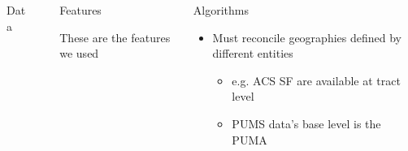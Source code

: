 \documentclass[final, 14pt]{beamer}
\newlength{\sepwid}
\newlength{\onecolwid}
\newlength{\twocolwid}
\begin{document}
\begin{frame}[t]
\begin{columns}[t]
\begin{column}{\onecolwid}
\begin{block}{Data}
\end{block}

\end{column} %



\begin{column}{\sepwid}\end{column} %

\begin{column}{\twocolwid} %

\begin{columns}[t,totalwidth=\twocolwid] %

\begin{column}{\onecolwid}\vspace{-.6in} %


\begin{block}{Features}

  These are the features we used 

\end{block}


\end{column} %

\begin{column}{\onecolwid}\vspace{-.6in} %


\begin{block}{Algorithms }
\begin{itemize}
\item Must reconcile geographies defined by different entities
\begin{itemize}
\item e.g. ACS SF are available at tract level
\item PUMS data's base level is the PUMA
\end{itemize}
\end{itemize}
\end{block}


\end{column}
\end{columns}
\end{column}
\end{columns}
\end{frame}
\end{document}
